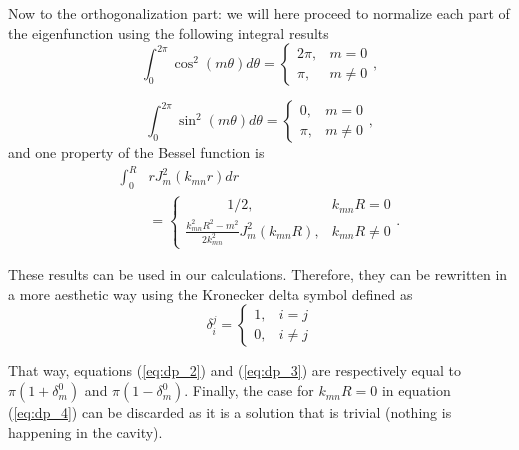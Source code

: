 \documentclass[%
 reprint,
 amsmath,amssymb,
 aip,
]{revtex4-1}
\begin{document}
Now to the orthogonalization part: we will here proceed to normalize each part of the eigenfunction using the following integral results
\begin{equation}
   \int_0^{2 \pi} \cos^2\left( m \theta \right) d\theta = 
    \begin{cases}    
        2 \pi, & m = 0\\
        \pi, & m \ne 0
    \end{cases}, \label{eq:dp_2}
\end{equation}

\begin{equation}
    \int_0^{2 \pi} \sin^2\left( m \theta \right) d\theta = 
    \begin{cases}    
        0, & m = 0\\
        \pi, & m \ne 0
    \end{cases}, \label{eq:dp_3}
\end{equation}
and one property of the Bessel function is
\begin{equation}
    \begin{split}
        \int_0^{R} &r J^2_m (k_{mn} r)dr \\ &=
    \begin{cases}    
        \quad  \quad \quad 1/2, & k_{mn}R = 0\\
        \frac{k^2_{mn} R^2 - m^2}{2 k^2_{mn}} J^2_m (k_{mn} R), & k_{mn}R \ne 0
    \end{cases}.
    \end{split} \label{eq:dp_4}
\end{equation}

These results can be used in our calculations. Therefore, they can be rewritten in a more aesthetic way using the Kronecker delta symbol defined as 
\begin{equation}
   \delta_i^j = \begin{cases}
       1, & i = j\\ 0, & i \ne j
   \end{cases} 
\end{equation}

That way, equations (\ref{eq:dp_2}) and (\ref{eq:dp_3}) are respectively equal to $\pi(1 + \delta_m^0)$ and $\pi(1 - \delta_m^0)$. Finally, the case for $k_{mn}R = 0$ in equation (\ref{eq:dp_4}) can be discarded as it is a solution that is trivial (nothing is happening in the cavity).
\end{document}
